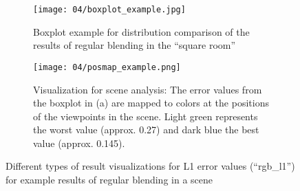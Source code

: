 \begin{figure}
\centering
    \hfill
    \begin{subfigure}[c]{0.5\textwidth}
            \centering
            \texttt{[image: 04/boxplot\_example.jpg]}
            \caption{Boxplot example for distribution comparison of the results of regular blending in the ``square room''} \label{fig:boxplot_example}
    \end{subfigure}%
    \hfill
    \begin{subfigure}[c]{0.5\textwidth}
            \centering
            \texttt{[image: 04/posmap\_example.png]}
            \caption{Visualization for scene analysis: The error values from the boxplot in (a) are mapped to colors at the positions of the viewpoints in the scene. Light green represents the worst value (approx. 0.27) and dark blue the best value (approx. 0.145).} \label{fig:posmap_example}
    \end{subfigure}
    \hfill
  \caption[Different types of result visualizations for L1 error values]{Different types of result visualizations for L1 error values (``rgb\_l1'') for example results of regular blending in a scene}
\end{figure}

